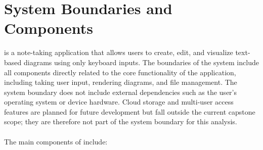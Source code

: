 \documentclass{article}
\begin{document}
\section{System Boundaries and Components}

\progname is a note-taking application that allows users to create, edit, and
visualize text-based diagrams using only keyboard inputs. The boundaries of
the system include all components directly related to the core functionality of
the application, including taking user input, rendering diagrams, and file 
management. The system boundary does not include external dependencies such as
the user's operating system or device hardware. Cloud storage and multi-user
access features are planned for future development but fall outside the current
capstone scope; they are therefore not part of the system boundary for this
analysis.
\\
\\
The main components of \progname include:
\end{document}
